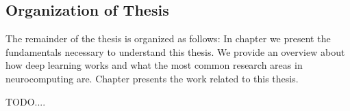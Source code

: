 \subsection{Organization of Thesis}
The remainder of the thesis is organized as follows: In chapter  we present the fundamentals necessary to understand this thesis. We provide an overview about how deep learning works and what the most common research areas in neurocomputing are. Chapter  presents the work related to this thesis.

TODO....



